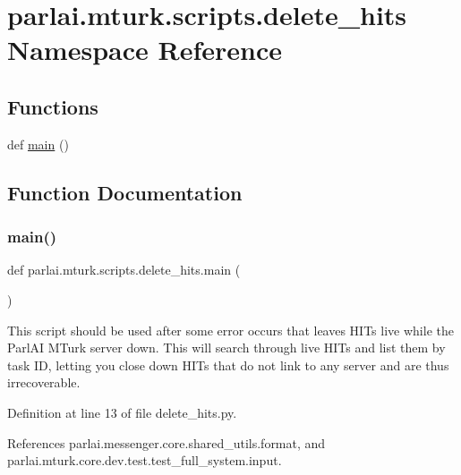 \hypertarget{namespaceparlai_1_1mturk_1_1scripts_1_1delete__hits}{}\section{parlai.\+mturk.\+scripts.\+delete\+\_\+hits Namespace Reference}
\label{namespaceparlai_1_1mturk_1_1scripts_1_1delete__hits}
\subsection*{Functions}
\begin{DoxyCompactItemize}
\item 
def \hyperlink{namespaceparlai_1_1mturk_1_1scripts_1_1delete__hits_a8dd24ac1eb6692d9295969d598138d05}{main} ()
\end{DoxyCompactItemize}


\subsection{Function Documentation}
\mbox{\label{namespaceparlai_1_1mturk_1_1scripts_1_1delete__hits_a8dd24ac1eb6692d9295969d598138d05}} 
\subsubsection{\texorpdfstring{main()}{main()}}
{\footnotesize\ttfamily def parlai.\+mturk.\+scripts.\+delete\+\_\+hits.\+main (\begin{DoxyParamCaption}{ }\end{DoxyParamCaption})}

\begin{DoxyVerb}This script should be used after some error occurs that leaves HITs live
while the ParlAI MTurk server down. This will search through live HITs and
list them by task ID, letting you close down HITs that do not link to
any server and are thus irrecoverable.
\end{DoxyVerb}
 

Definition at line 13 of file delete\+\_\+hits.\+py.



References parlai.\+messenger.\+core.\+shared\+\_\+utils.\+format, and parlai.\+mturk.\+core.\+dev.\+test.\+test\+\_\+full\+\_\+system.\+input.


